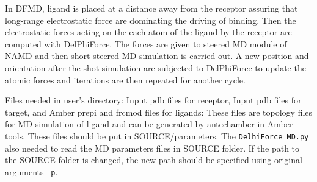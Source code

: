 \documentclass[9pt,tutorial]{livecoms}
\begin{document}
In DFMD, ligand is placed at a distance away from the receptor assuring that long-range electrostatic force are dominating the driving of binding. Then the electrostatic forces acting on the each atom of the ligand by the receptor are computed with DelPhiForce\cite{li2017delphiforce}. The forces are given to steered MD module of NAMD and then short steered MD simulation is carried out. A new position and orientation after the shot simulation are subjected to DelPhiForce to update the atomic forces and iterations are then repeated for another cycle.

Files needed in user’s directory:
Input pdb files for receptor, Input pdb files for target, and Amber prepi and frcmod files for ligands: These files are topology files for MD simulation of ligand and can be generated by antechamber in Amber tools. These files should be put in SOURCE/parameters. The \texttt{DelhiForce\_MD.py} also needed to read the MD parameters files in SOURCE folder. If the path to the SOURCE folder is changed, the new path should be specified using original arguments \texttt{–p}.
\end{document}

